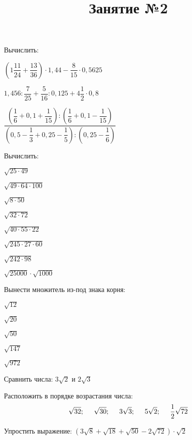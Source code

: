 \documentclass[12pt, a4paper]{article}
\begin{document}
	\title{Занятие №2}
	\begin{enumcols}[label=\textbf{\arabic*.}]
		\item Вычислить:
		\begin{enumcols}[itemcolumns=2]
			\item \( \left( 1\dfrac{11}{24}+\dfrac{13}{36} \right)\cdot1,44-\dfrac{8}{15}\cdot0,5625 \)
			\item \( 1,456:\dfrac{7}{25}+\dfrac{5}{16}:0,125+4\dfrac{1}{2}\cdot0,8 \)
			\item \( \dfrac{\left( \dfrac{1}{6}+0,1+\dfrac{1}{15} \right):\left( \dfrac{1}{6}+0,1-\dfrac{1}{15} \right)}{\left( 0,5-\dfrac{1}{3}+0,25-\dfrac{1}{5} \right):\left( 0,25-\dfrac{1}{6} \right)} \)
		\end{enumcols}
		\item Вычислить:
		\begin{enumcols}[itemcolumns=4]
			\item \( \sqrt{25\cdot49} \)
			\item \( \sqrt{49\cdot64\cdot100} \)
			\item \( \sqrt{8\cdot50} \)
			\item \( \sqrt{32\cdot72} \)
			\item \( \sqrt{40\cdot55\cdot22} \)
			\item \( \sqrt{245\cdot27\cdot60} \)
			\item \( \sqrt{242\cdot98} \)
			\item \( \sqrt{25000}\cdot\sqrt{1000} \)
		\end{enumcols}
		\item Вынести множитель из-под знака корня:
		\begin{enumcols}[itemcolumns=5]
			\item \( \sqrt{12} \)
			\item \( \sqrt{20} \)
			\item \( \sqrt{50} \)
			\item \( \sqrt{147} \)
			\item \( \sqrt{972} \)
		\end{enumcols}
		\item Сравнить числа: \( 3\sqrt{2} \) и \( 2\sqrt{3} \)
		\item Расположить в порядке возрастания числа:
		\[ \sqrt{32};\hspace{0.5cm}\sqrt{30};\hspace{0.5cm}3\sqrt{3};\hspace{0.5cm}5\sqrt{2};\hspace{0.5cm}\dfrac{1}{2}\sqrt{72} \]
		\item Упростить выражение: \( (3\sqrt{8}+\sqrt{18}+\sqrt{50}-2\sqrt{72})\cdot\sqrt{2} \)
	\end{enumcols}
\end{document}
